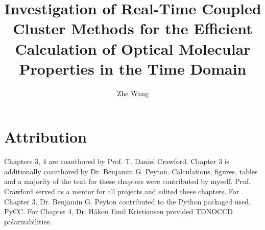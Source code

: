 \documentclass[doublespace, nopageskip]{VTthesis} %
\title{Investigation of Real-Time Coupled Cluster Methods for the Efficient Calculation of Optical Molecular Properties in the Time Domain}
\author{Zhe Wang}
\begin{document}
  \frontmatter
  \maketitle
  \tableofcontents

	\listoffigures
	\listoftables

 
 
 

    \chapter*{Attribution}
Chapters 3, 4 are coauthored by Prof. T. Daniel Crawford. Chapter 3 is additionally coauthored 
by Dr. Benjamin G. Peyton. 
Calculations, figures, tables and a majority of the text for these chapters were contributed by myself. Prof. Crawford served as a mentor for all projects and edited these chapters. For Chapter 3. Dr. Benjamin G. Peyton contributed to the Python packaged used, PyCC. For Chapter 4, Dr. H{\aa}kon Emil Kristiansen provided TDNOCCD polarizabilities.

	\mainmatter
    
    
    
    
    

    

      
	
\end{document}
